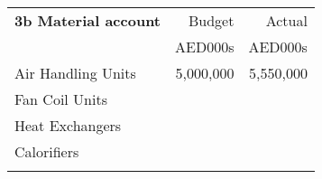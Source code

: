 \documentclass[oneside]{scrbook}
\makeatletter
\def\dotfill{%
\color{spot!50}%
\leavevmode
\cleaders \hb@xt@ 4pt{\hss \resizebox{1.5pt}{!}{\char"25CF}\relax\hss}\hfill
\kern\z@}%
\newcommand{\DotRow}[2]{%
\hbox to \columnwidth{\rule[-3pt]{0pt}{6pt}\dotfill}\break
}
\makeatother
\begin{document}
\vspace*{1cm}
\parindent0pt
\begin{tabularx}{\linewidth}{Xrr}
\textbf{3b Material account}                                     &Budget   &Actual\\
                                                                               &AED000s &AED000s\\
\noalign{\DotRow{}{}}                                                                                  
Air Handling Units								  &5,000,000 &5,550,000\\
Fan Coil Units                                                          &               &             \\                                                                               
Heat Exchangers                                                      &               &             \\
Calorifiers                                                                &               &             \\
\noalign{\DotRow{}{}}                                                                              
\end{tabularx}    
\vspace*{1.8cm}
\end{document}
